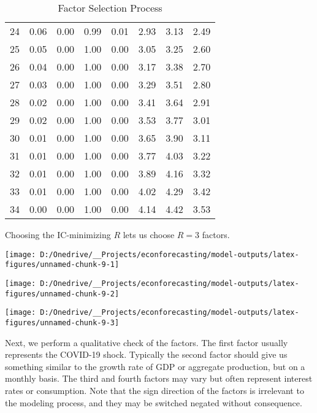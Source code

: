 \documentclass[11pt, letterpaper]{article}\usepackage[]{graphicx}\usepackage[]{color}
\begin{document}
\begin{table}[H]
\begin{tabular}{cccccccc}
   24 & 0.06 & 0.00 & 0.99 & 0.01 & 2.93 & 3.13 & 2.49 \\ 
   25 & 0.05 & 0.00 & 1.00 & 0.00 & 3.05 & 3.25 & 2.60 \\ 
   26 & 0.04 & 0.00 & 1.00 & 0.00 & 3.17 & 3.38 & 2.70 \\ 
   27 & 0.03 & 0.00 & 1.00 & 0.00 & 3.29 & 3.51 & 2.80 \\ 
   28 & 0.02 & 0.00 & 1.00 & 0.00 & 3.41 & 3.64 & 2.91 \\ 
   29 & 0.02 & 0.00 & 1.00 & 0.00 & 3.53 & 3.77 & 3.01 \\ 
   30 & 0.01 & 0.00 & 1.00 & 0.00 & 3.65 & 3.90 & 3.11 \\ 
   31 & 0.01 & 0.00 & 1.00 & 0.00 & 3.77 & 4.03 & 3.22 \\ 
   32 & 0.01 & 0.00 & 1.00 & 0.00 & 3.89 & 4.16 & 3.32 \\ 
   33 & 0.01 & 0.00 & 1.00 & 0.00 & 4.02 & 4.29 & 3.42 \\ 
   34 & 0.00 & 0.00 & 1.00 & 0.00 & 4.14 & 4.42 & 3.53 \\ 
   \hline
\end{tabular}
\endgroup
\caption{Factor Selection Process} 
\end{table}


Choosing the IC-minimizing $R$ lets us choose $R = 3$ factors.



{\centering \texttt{[image: D:/Onedrive/\_\_Projects/econforecasting/model-outputs/latex-figures/unnamed-chunk-9-1]} 

}




{\centering \texttt{[image: D:/Onedrive/\_\_Projects/econforecasting/model-outputs/latex-figures/unnamed-chunk-9-2]} 

}




{\centering \texttt{[image: D:/Onedrive/\_\_Projects/econforecasting/model-outputs/latex-figures/unnamed-chunk-9-3]} 

}




Next, we perform a qualitative check of the factors. The first factor usually represents the COVID-19 shock. Typically the second factor should give us something similar to the growth rate of GDP or aggregate production, but on a monthly basis. The third and fourth factors may vary but often represent interest rates or consumption. Note that the sign direction of the factors is irrelevant to the modeling process, and they may be switched negated without consequence. 
\end{document}
